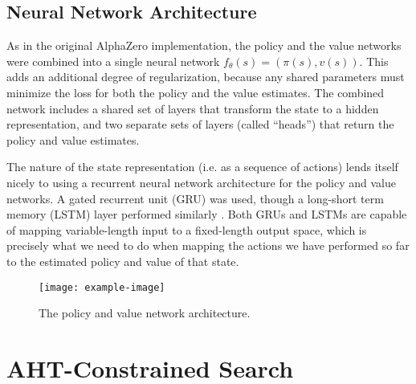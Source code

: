 
\subsection{Neural Network Architecture}

As in the original AlphaZero implementation, the policy and the value networks were combined into a single neural network $f_\theta(s) = (\pi(s), v(s))$. This adds an additional degree of regularization, because any shared parameters must minimize the loss for both the policy and the value estimates. The combined network includes a shared set of layers that transform the state to a hidden representation, and two separate sets of layers (called ``heads'') that return the policy and value estimates.


The nature of the state representation (i.e. as a sequence of actions) lends itself nicely to using a recurrent neural network architecture for the policy and value networks. A gated recurrent unit (GRU) was used, though a long-short term memory (LSTM) layer performed similarly \cite{cho2014learning, lstm}.
Both GRUs and LSTMs are capable of mapping variable-length input to a fixed-length output space, which is precisely what we need to do when mapping the actions we have performed so far to the estimated policy and value of that state.

\begin{figure}
    \centering
    \texttt{[image: example-image]}
    \caption{The policy and value network architecture.}
    \label{fig:nn}
\end{figure}


\section{AHT-Constrained Search}


\lipsum[1-2]


